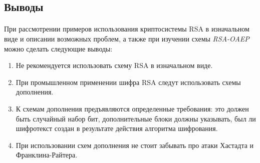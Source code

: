   \subsection{Выводы}

  \paragraph{} При рассмотрении примеров использования криптосистемы RSA в изначальном виде и описании возможных проблем, а также при изучении схемы \textit{RSA-OAEP} можно сделать следующие выводы:
    \begin{enumerate}
      \item Не рекомендуется использовать схему RSA в изначальном виде.
      \item При промышленном применении шифра RSA следут использовать схемы дополнения.
      \item К схемам дополнения предъявляются определенные требования: это должен быть случайный набор бит, дополнительные блоки должны указывать, был ли шифротекст создан в результате действия алгоритма шифрования.
      \item При использовании схем дополнения не стоит забывать про атаки Хастадта и Франклина-Райтера.
    \end{enumerate}